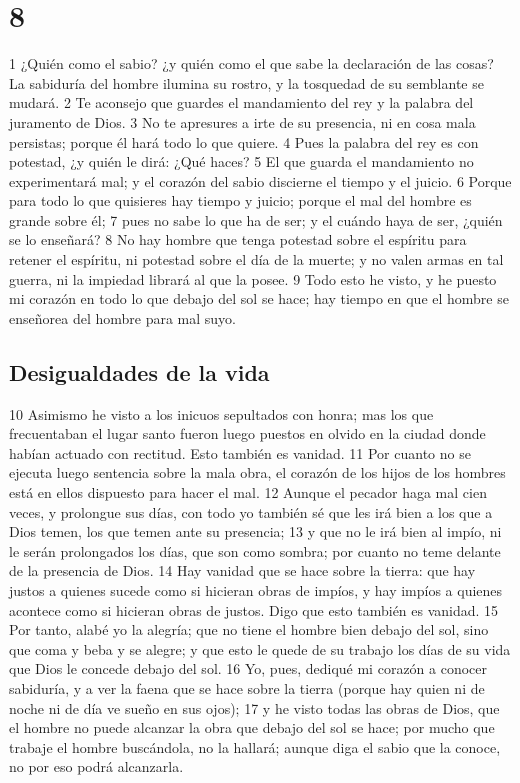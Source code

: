 \chapter{8}

1 ¿Quién como el sabio? ¿y quién como el que sabe la declaración de las cosas? La sabiduría del hombre ilumina su rostro, y la tosquedad de su semblante se mudará.
2 Te aconsejo que guardes el mandamiento del rey y la palabra del juramento de Dios.
3 No te apresures a irte de su presencia, ni en cosa mala persistas; porque él hará todo lo que quiere.
4 Pues la palabra del rey es con potestad, ¿y quién le dirá: ¿Qué haces?
5 El que guarda el mandamiento no experimentará mal; y el corazón del sabio discierne el tiempo y el juicio.
6 Porque para todo lo que quisieres hay tiempo y juicio; porque el mal del hombre es grande sobre él;
7 pues no sabe lo que ha de ser; y el cuándo haya de ser, ¿quién se lo enseñará?
8 No hay hombre que tenga potestad sobre el espíritu para retener el espíritu, ni potestad sobre el día de la muerte; y no valen armas en tal guerra, ni la impiedad librará al que la posee.
9 Todo esto he visto, y he puesto mi corazón en todo lo que debajo del sol se hace; hay tiempo en que el hombre se enseñorea del hombre para mal suyo.

\section*{Desigualdades de la vida}

10 Asimismo he visto a los inicuos sepultados con honra; mas los que frecuentaban el lugar santo fueron luego puestos en olvido en la ciudad donde habían actuado con rectitud. Esto también es vanidad.
11 Por cuanto no se ejecuta luego sentencia sobre la mala obra, el corazón de los hijos de los hombres está en ellos dispuesto para hacer el mal.
12 Aunque el pecador haga mal cien veces, y prolongue sus días, con todo yo también sé que les irá bien a los que a Dios temen, los que temen ante su presencia;
13 y que no le irá bien al impío, ni le serán prolongados los días, que son como sombra; por cuanto no teme delante de la presencia de Dios.
14 Hay vanidad que se hace sobre la tierra: que hay justos a quienes sucede como si hicieran obras de impíos, y hay impíos a quienes acontece como si hicieran obras de justos. Digo que esto también es vanidad.
15 Por tanto, alabé yo la alegría; que no tiene el hombre bien debajo del sol, sino que coma y beba y se alegre; y que esto le quede de su trabajo los días de su vida que Dios le concede debajo del sol.
16 Yo, pues, dediqué mi corazón a conocer sabiduría, y a ver la faena que se hace sobre la tierra (porque hay quien ni de noche ni de día ve sueño en sus ojos);
17 y he visto todas las obras de Dios, que el hombre no puede alcanzar la obra que debajo del sol se hace; por mucho que trabaje el hombre buscándola, no la hallará; aunque diga el sabio que la conoce, no por eso podrá alcanzarla.

